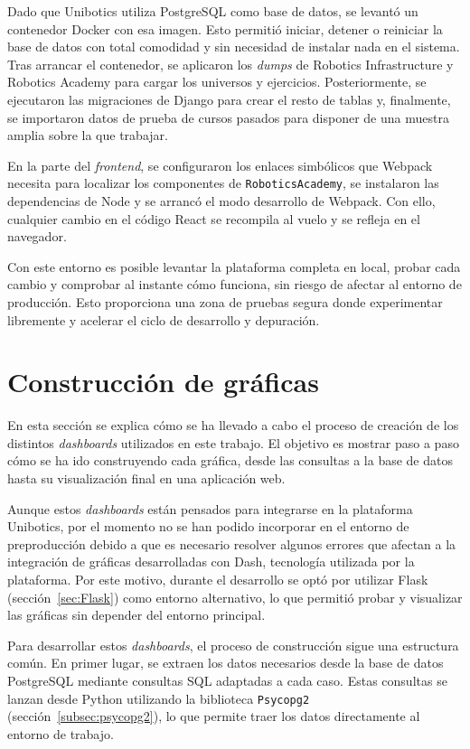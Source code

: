 \documentclass[a4paper, 12pt]{book}
\begin{document}
Dado que Unibotics utiliza PostgreSQL como base de datos, se levantó un contenedor Docker con esa imagen. Esto permitió iniciar, detener o reiniciar la base de datos con total comodidad y sin necesidad de instalar nada en el sistema. Tras arrancar el contenedor, se aplicaron los \textit{dumps} de Robotics Infrastructure y Robotics Academy para cargar los universos y ejercicios. Posteriormente, se ejecutaron las migraciones de Django para crear el resto de tablas y, finalmente, se importaron datos de prueba de cursos pasados para disponer de una muestra amplia sobre la que trabajar.

En la parte del \textit{frontend}, se configuraron los enlaces simbólicos que Webpack necesita para localizar los componentes de \texttt{RoboticsAcademy}, se instalaron las dependencias de Node y se arrancó el modo desarrollo de Webpack. Con ello, cualquier cambio en el código React se recompila al vuelo y se refleja en el navegador.

Con este entorno es posible levantar la plataforma completa en local, probar cada cambio y comprobar al instante cómo funciona, sin riesgo de afectar al entorno de producción. Esto proporciona una zona de pruebas segura donde experimentar libremente y acelerar el ciclo de desarrollo y depuración.


\section{Construcción de gráficas}

En esta sección se explica cómo se ha llevado a cabo el proceso de creación de los distintos \textit{dashboards} utilizados en este trabajo. El objetivo es mostrar paso a paso cómo se ha ido construyendo cada gráfica, desde las consultas a la base de datos hasta su visualización final en una aplicación web.

Aunque estos \textit{dashboards} están pensados para integrarse en la plataforma Unibotics, por el momento no se han podido incorporar en el entorno de preproducción debido a que es necesario resolver algunos errores que afectan a la integración de gráficas desarrolladas con Dash, tecnología utilizada por la plataforma. Por este motivo, durante el desarrollo se optó por utilizar Flask (sección~\ref{sec:Flask}) como entorno alternativo, lo que permitió probar y visualizar las gráficas sin depender del entorno principal.

Para desarrollar estos \textit{dashboards}, el proceso de construcción sigue una estructura común. En primer lugar, se extraen los datos necesarios desde la base de datos PostgreSQL mediante consultas SQL adaptadas a cada caso. Estas consultas se lanzan desde Python utilizando la biblioteca \texttt{Psycopg2} (sección~\ref{subsec:psycopg2}), lo que permite traer los datos directamente al entorno de trabajo.
\end{document}
